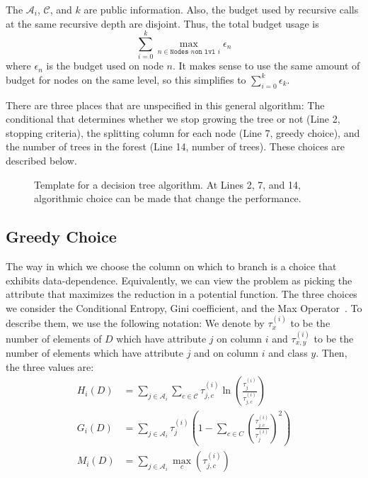 \documentclass[11pt]{report}
\renewcommand{\t}[1]{\texttt{#1}}
\begin{document}
The $\mathcal{A}_i$, $\mathcal{C}$, and $k$ are public information. Also, the budget used by recursive calls at the same recursive depth are disjoint. Thus, the total budget usage is
\[
\sum_{i=0}^k \max_{n \in \t{Nodes }n \t{on lvl }i} \epsilon_n
\]
where $\epsilon_n$ is the budget used on node $n$. It makes sense to use the same amount of budget for nodes on the same level, so this simplifies to $\sum_{i=0}^k \epsilon_{k}$.

There are three places that are unspecified in this general algorithm: The conditional that determines whether we stop growing the tree or not (Line 2, stopping criteria), the splitting column for each node (Line 7, greedy choice), and the number of trees in the forest (Line 14, number of trees). These choices are described below.
\begin{figure}


\caption{Template for a decision tree algorithm. At Lines 2, 7, and 14, algorithmic choice can be made that change the performance.}\label{fig:c45}
\end{figure}

\subsection{Greedy Choice}
The way in which we choose the column on which to branch is a choice that exhibits data-dependence. Equivalently, we can view the problem as picking the attribute that maximizes the reduction in a potential function. The three choices we consider the Conditional Entropy, Gini coefficient, and the Max Operator~\cite{Friedman:2010}. To describe them, we use the following notation:
We denote by $\tau^{(i)}_{x}$ to be the number of elements of $D$ which have attribute $j$ on column $i$ and $\tau^{(i)}_{x,y}$ to be the number of elements which have attribute $j$ and on column $i$ and class $y$.
Then, the three values are:
\begin{align}
H_i(D) &= \sum_{j\in \mathcal{A}_i}\sum_{c \in \mathcal{C}} {\tau^{(i)}_{j,c}}\ln\left(\frac{\tau^{(i)}_{j}}{\tau^{(i)}_{j,c}}\right) \label{eq:ent} \\
G_i(D) &= \sum_{j \in \mathcal{A}_i} \tau^{(i)}_j\left(1-\sum_{c \in C}\left(\frac{\tau^{(i)}_{j,c}}{\tau^{(i)}_{j}}\right)^2\right)\label{eq:gini} \\
M_i(D) &= \sum_{j \in \mathcal{A}_i} \max_c(\tau^{(i)}_{j,c})
\label{eq:max}
\end{align}
\end{document}

